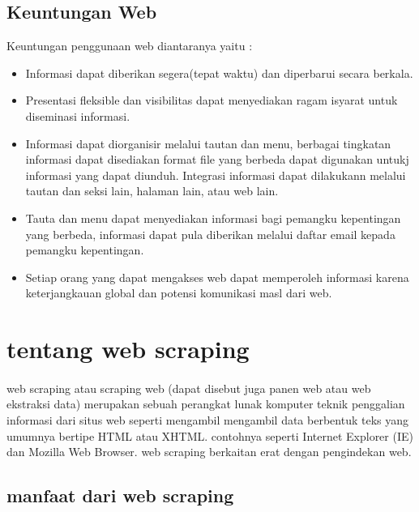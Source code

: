 \documentclass[12pt, a4paper]{article}
\begin{document}
\subsection{Keuntungan Web}
Keuntungan penggunaan web diantaranya yaitu :
\begin{itemize}
\item Informasi dapat diberikan segera(tepat waktu) dan diperbarui secara berkala.
\item Presentasi fleksible dan visibilitas dapat menyediakan ragam isyarat untuk diseminasi informasi.
\item Informasi dapat diorganisir melalui tautan dan menu, berbagai tingkatan informasi dapat disediakan format file yang berbeda dapat digunakan untukj informasi yang dapat diunduh. Integrasi informasi dapat dilakukann melalui tautan dan seksi lain, halaman lain, atau web lain.
\item Tauta  dan menu dapat menyediakan informasi bagi pemangku kepentingan yang berbeda, informasi dapat pula diberikan melalui daftar email kepada pemangku kepentingan.
\item Setiap orang yang dapat mengakses web dapat memperoleh informasi karena keterjangkauan global dan potensi komunikasi masl dari web.
\end{itemize}
	   
\section{tentang web scraping}
\paragraph{}web scraping atau scraping web (dapat disebut juga panen web atau web ekstraksi data) merupakan sebuah
perangkat lunak komputer teknik penggalian informasi dari situs web seperti mengambil mengambil data
berbentuk teks yang umumnya bertipe HTML atau XHTML. contohnya seperti Internet Explorer (IE) dan Mozilla Web
Browser. web scraping berkaitan erat dengan pengindekan web.

\subsection{manfaat dari web scraping}
\end{document}
